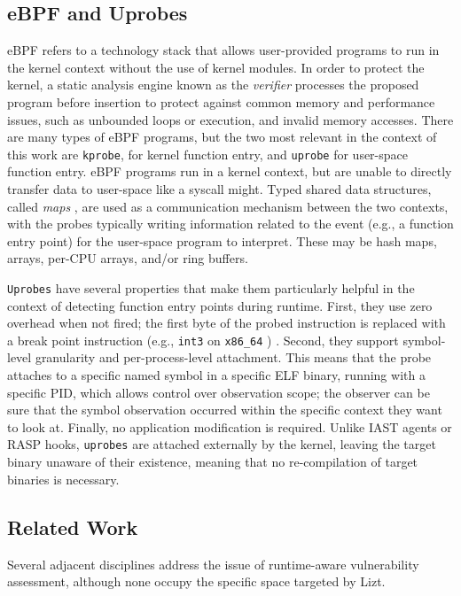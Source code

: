 \documentclass[conference]{IEEEtran}
\begin{document}
\subsection{eBPF and Uprobes}
\label{sec:ebpf}

eBPF refers to a technology stack that allows user-provided programs to run in the kernel context without the use of kernel modules. In order to protect the kernel, a static analysis engine known as the \textit{verifier} processes the proposed program before insertion to protect against common memory and performance issues, such as unbounded loops or execution, and invalid memory accesses. There are many types of eBPF programs, but the two most relevant in the context of this work are \texttt{kprobe}, for kernel function entry, and \texttt{uprobe} for user-space function entry. eBPF programs run in a kernel context, but are unable to directly transfer data to user-space like a syscall might. Typed shared data structures, called \textit{maps} , are used as a communication mechanism between the two contexts, with the probes typically writing information related to the event (e.g., a function entry point) for the user-space program to interpret. These may be hash maps, arrays, per-CPU arrays, and/or ring buffers.

\texttt{Uprobes} have several properties that make them particularly helpful in the context of detecting function entry points during runtime. First, they use zero overhead when not fired; the first byte of the probed instruction is replaced with a break point instruction (e.g., \texttt{int3} on \texttt{x86\_64} ) \cite{kernel_kprobes}  \cite{corbet_uprobes_2012}. Second, they support symbol-level granularity and per-process-level attachment. This means that the probe attaches to a specific named symbol in a specific ELF binary, running with a specific PID, which allows control over observation scope; the observer can be sure that the symbol observation occurred within the specific context they want to look at. Finally, no application modification is required. Unlike IAST agents or RASP hooks, \texttt{uprobes} are attached externally by the kernel, leaving the target binary unaware of their existence, meaning that no re-compilation of target binaries is necessary.

\subsection{Related Work}

Several adjacent disciplines address the issue of runtime-aware vulnerability assessment, although none occupy the specific space targeted by Lizt.
\end{document}

